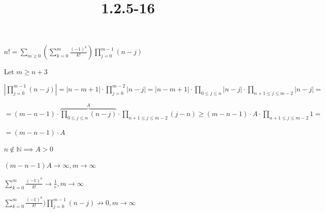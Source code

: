 \documentclass{article}
\title{1.2.5-16}
\begin{document}
\maketitle

$n! = \sum_{m \geq 0}(\sum_{k=0}^m \frac{(-1)^k}{k!})\prod_{j=0}^{m-1}(n-j)$

Let $m \geq n + 3$

$|\prod_{j=0}^{m-1}(n-j)| = |n-m+1| \cdot \prod_{j=0}^{m-2}|n-j| = |n-m+1| \cdot \prod_{0 \leq j \leq n} |n-j| \cdot \prod_{n + 1 \leq j \leq m - 2} |n-j| =$

$= (m-n-1) \cdot \overbrace{\prod_{0 \leq j \leq n} (n-j)}^A \cdot \prod_{n + 1 \leq j \leq m - 2} (j - n) \geq (m-n-1) \cdot A \cdot \prod_{n + 1 \leq j \leq m - 2} 1 =$

$= (m-n-1) \cdot A$

$n \notin \mathbb{N} \implies A > 0$

$(m-n-1)A \to \infty, m\to\infty$

$\sum_{k=0}^m \frac{(-1)^k}{k!} \to \frac{1}{e}, m \to \infty$

$\sum_{k=0}^m \frac{(-1)^k}{k!})\prod_{j=0}^{m-1}(n-j) \not\to 0, m \to \infty$
\end{document}
